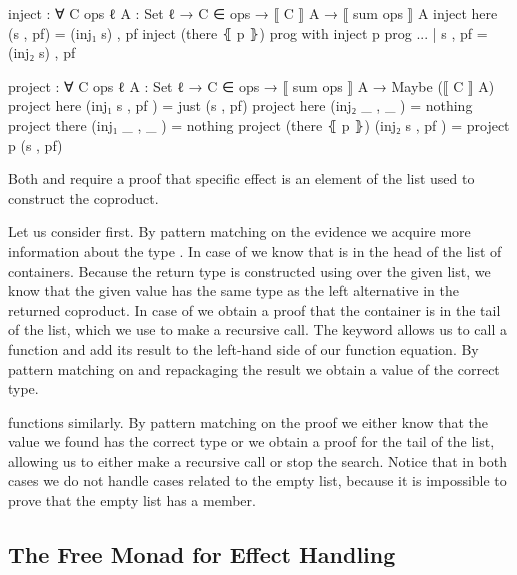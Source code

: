 \begin{code}
inject : ∀ {C ops ℓ} {A : Set ℓ} → C ∈ ops → ⟦ C ⟧ A → ⟦ sum ops ⟧ A
inject here           (s , pf)  = (inj₁ s) , pf
inject (there ⦃ p ⦄)  prog      with inject p prog
... | s , pf = (inj₂ s) , pf

project : ∀ {C ops ℓ} {A : Set ℓ} → C ∈ ops → ⟦ sum ops ⟧ A → Maybe (⟦ C ⟧ A)
project here           (inj₁ s  , pf  )  = just (s , pf)
project here           (inj₂ _  , _   )  = nothing
project there          (inj₁ _  , _   )  = nothing
project (there ⦃ p ⦄)  (inj₂ s  , pf  )  = project p (s , pf)
\end{code}
Both  and  require a proof that
specific effect is an element of the list used to construct the coproduct.

Let us consider  first.
By pattern matching on the evidence we acquire more information about the type
\AgdaSpace{}.
In case of  we know that  is in
the head of the list of containers.
Because the return type is constructed using  over the given
list, we know that the given value
\AgdaSpace{}\AgdaInductiveConstructor{,}\AgdaSpace{}
has the same type as the left alternative in the returned coproduct.
In case of  we obtain a proof that the container
is in the tail of the list, which we use to make a recursive call.
The  keyword allows us to call a function and add its result
to the left-hand side of our function equation. %
By pattern matching on and repackaging the result we obtain a value of the
correct type.

 functions similarly.
By pattern matching on the proof we either know that the value we found has
the correct type or we obtain a proof for the tail of the list, allowing us to
either make a recursive call or stop the search.
Notice that in both cases we do not handle cases related to the empty list,
because it is impossible to prove that the empty list has a member.


\subsection{The Free Monad for Effect Handling}
\label{first-order:free-monad}

